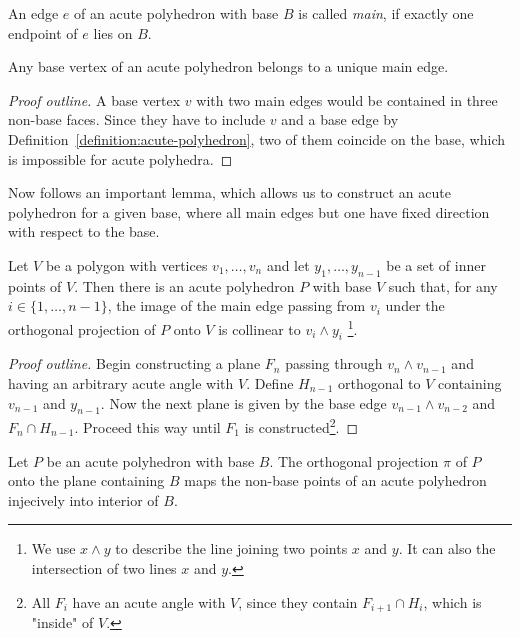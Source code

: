 \begin{definition}
  An edge $e$ of an acute polyhedron with base $B$ is called \emph{main}, if exactly one endpoint of $e$ lies on $B$.
\end{definition}

\begin{lemma}
  Any base vertex of an acute polyhedron belongs to a unique main edge.
\end{lemma}

\begin{proof}[Proof outline]
  A base vertex $v$ with two main edges would be contained in three non-base faces. Since they have to include $v$ and a base edge by Definition~\ref{definition:acute-polyhedron}, two of them coincide on the base, which is impossible for acute polyhedra.
\end{proof}

Now follows an important lemma, which allows us to construct an acute polyhedron for a given base, where all main edges but one have fixed direction with respect to the base.

\begin{lemma}\label{lemma:acute-direction}
  Let $V$ be a polygon with vertices $v_1,\dots,v_n$ and let $y_1,\dots,y_{n-1}$ be a set of inner points of $V$.
  Then there is an acute polyhedron $P$ with base $V$ such that, for any $i \in \{1,\dots,n-1\}$, the image of the main edge passing from $v_i$ under the orthogonal projection of $P$ onto $V$ is collinear to $v_i \wedge y_i$ \footnote{We use $x \wedge y$ to describe the line joining two points $x$ and $y$. It can also the intersection of two lines $x$ and $y$.}.
\end{lemma}

\begin{proof}[Proof outline]
  Begin constructing a plane $F_n$ passing through $v_n \wedge v_{n-1}$ and having an arbitrary acute angle with $V$. Define $H_{n-1}$ orthogonal to $V$ containing $v_{n-1}$ and $y_{n-1}$. Now the next plane is given by the base edge $v_{n-1} \wedge v_{n-2}$ and $F_n \cap H_{n-1}$. Proceed this way until $F_1$ is constructed\footnote{All $F_i$ have an acute angle with $V$, since they contain $F_{i+1} \cap H_i$, which is "inside" of $V$.}.
\end{proof}

\begin{observation}\label{observation:acute-projection}
  Let $P$ be an acute polyhedron with base $B$.
  The orthogonal projection $\pi$ of $P$ onto the plane containing $B$ maps the non-base points of an acute polyhedron injecively into interior of $B$.
\end{observation}


